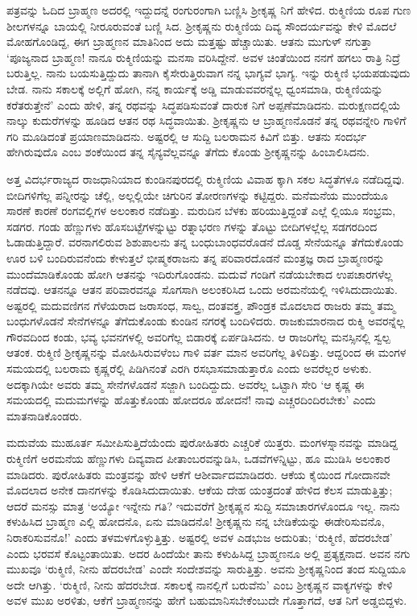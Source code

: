 ಪತ್ರವನ್ನು ಓದಿದ ಬ್ರಾಹ್ಮಣ ಅದರಲ್ಲಿ ಇದ್ದುದನ್ನೆ ರಂಗುರಂಗಾಗಿ ಬಣ್ಣಿಸಿ ಶ್ರೀಕೃಷ್ಣ ನಿಗೆ ಹೇಳಿದ. ರುಕ್ಮಿಣಿಯ ರೂಪ ಗುಣ ಶೀಲಗಳನ್ನೂ ಬಾಯಲ್ಲಿ ನೀರೂರುವಂತೆ ಬಣ್ಣಿ ಸಿದ. ಶ್ರೀಕೃಷ್ಣನು ರುಕ್ಮಿಣಿಯ ದಿವ್ಯ ಸೌಂದರ್ಯವನ್ನು ಕೇಳಿ ಮೊದಲೆ ಮೋಹಗೊಂಡಿದ್ದ, ಈಗ ಬ್ರಾಹ್ಮಣನ ಮಾತಿನಿಂದ ಅದು ಮತ್ತಷ್ಟು ಹೆಚ್ಚಾಯಿತು. ಆತನು ಮುಗುಳ್ ನಗುತ್ತಾ ‘ಪೂಜ್ಯನಾದ ಬ್ರಾಹ್ಮಣ! ನಾನೂ ರುಕ್ಮಿಣಿಯನ್ನು ಮನಸಾ ವರಿಸಿದ್ದೇನೆ. ಅವಳ ಚಿಂತೆಯಿಂದ ನನಗೆ ಹಗಲು ರಾತ್ರಿ ನಿದ್ರೆ ಬರುತ್ತಿಲ್ಲ. ನಾನು ಬಯಸುತ್ತಿದ್ದುದು ತಾನಾಗಿ ಕೈಸೇರುತ್ತಿರುವಾಗ ನನ್ನ ಭಾಗ್ಯವೆ ಭಾಗ್ಯ. ಇನ್ನು ರುಕ್ಮಿಣಿ ಭಯಪಡುವುದು ಬೇಡ. ನಾನು ಸಕಾಲಕ್ಕೆ ಅಲ್ಲಿಗೆ ಹೋಗಿ, ನನ್ನ ಕಾರ್ಯಕ್ಕೆ ಅಡ್ಡಿ ಮಾಡುವವರನ್ನೆಲ್ಲ ಧ್ವಂಸಮಾಡಿ, ರುಕ್ಮಿಣಿಯನ್ನು ಕರೆತರುತ್ತೇನೆ’ ಎಂದು ಹೇಳಿ, ತನ್ನ ರಥವನ್ನು ಸಿದ್ಧಪಡಿಸುವಂತೆ ದಾರುಕ ನಿಗೆ ಅಪ್ಪಣೆಮಾಡಿದನು. ಮರುಕ್ಷಣದಲ್ಲಿಯೆ ನಾಲ್ಕು ಕುದುರೆಗಳನ್ನು ಹೂಡಿದ ಆತನ ರಥ ಸಿದ್ಧವಾಯಿತು. ಶ್ರೀಕೃಷ್ಣನು ಆ ಬ್ರಾಹ್ಮಣನೊಡನೆ ತನ್ನ ರಥವನ್ನೇರಿ ಗಾಳಿಗೆ ಗರಿ ಮೂಡಿದಂತೆ ಪ್ರಯಾಣಮಾಡಿದನು. ಅಷ್ಟರಲ್ಲಿ ಆ ಸುದ್ದಿ ಬಲರಾಮನ ಕಿವಿಗೆ ಬಿತ್ತು. ಆತನು ಸಂದರ್ಭ ಹೇಗಿರುವುದೊ ಎಂಬ ಶಂಕೆಯಿಂದ ತನ್ನ ಸೈನ್ಯವೆಲ್ಲವನ್ನೂ ತೆಗೆದು ಕೊಂಡು ಶ್ರೀಕೃಷ್ಣನನ್ನು ಹಿಂಬಾಲಿಸಿದನು.

ಅತ್ತ ವಿದರ್ಭರಾಜ್ಯದ ರಾಜಧಾನಿಯಾದ ಕುಂಡಿನಪುರದಲ್ಲಿ ರುಕ್ಮಿಣಿಯ ವಿವಾಹ ಕ್ಕಾಗಿ ಸಕಲ ಸಿದ್ಧತೆಗಳೂ ನಡೆದಿದ್ದವು. ಬೀದಿಗಳಿಗೆಲ್ಲ ಪನ್ನೀರನ್ನು ಚೆಲ್ಲಿ, ಅಲ್ಲಲ್ಲಿಯೇ ಚಿಗುರಿನ ತೋರಣಗಳನ್ನು ಕಟ್ಟಿದ್ದರು. ಮನೆಮನೆಯ ಮುಂದೆಯೂ ಸಾರಣೆ ಕಾರಣೆ ರಂಗವಲ್ಲಿಗಳ ಅಲಂಕಾರ ನಡೆದಿತ್ತು. ಮರುದಿನ ಬೆಳಕು ಹರಿಯುತ್ತಿದ್ದಂತೆ ಎಲ್ಲೆ ಲ್ಲಿಯೂ ಸಂಭ್ರಮ, ಸಡಗರ. ಗಂಡು ಹೆಣ್ಣುಗಳು ಹೊಸಬಟ್ಟೆಗಳನ್ನುಟ್ಟು ರತ್ನಾಭರಣ ಗಳನ್ನು ತೊಟ್ಟು ಬೀದಿಗಳಲ್ಲೆಲ್ಲ ಸಡಗರದಿಂದ ಓಡಾಡುತ್ತಿದ್ದಾರೆ. ವರನಾಗಲಿರುವ ಶಿಶುಪಾಲನು ತನ್ನ ಬಂಧುಬಾಂಧವರೊಡನೆ ದೊಡ್ಡ ಸೇನೆಯನ್ನೂ ತೆಗೆದುಕೊಂಡು ಊರ ಬಳಿ ಬಂದಿರುವನೆಂದು ಕೇಳುತ್ತಲೆ ಭೀಷ್ಮಕರಾಜನು ತನ್ನ ಪರಿವಾರದೊಡನೆ ಮಂತ್ರಜ್ಞ ರಾದ ಬ್ರಾಹ್ಮಣರನ್ನು ಮುಂದೆಮಾಡಿಕೊಂಡು ಹೋಗಿ ಆತನನ್ನು ಇದಿರುಗೊಂಡನು. ಮದುವೆ ಗಂಡಿಗೆ ನಡೆಯಬೇಕಾದ ಉಪಚಾರಗಳೆಲ್ಲ ನಡೆದವು. ಆತನನ್ನೂ ಆತನ ಪರಿವಾರವನ್ನೂ ಸೊಗಸಾಗಿ ಅಲಂಕರಿಸಿದ ಒಂದು ಅರಮನೆಯಲ್ಲಿ ಇಳಿಸಿದುದಾಯಿತು. ಅಷ್ಟರಲ್ಲಿ ಮದುವಣಿಗನ ಗೆಳೆಯರಾದ ಜರಾಸಂಧ, ಸಾಲ್ವ, ದಂತವಕ್ತ್ರ, ಪೌಂಡ್ರಕ ಮೊದಲಾದ ರಾಜರು ತಮ್ಮ ತಮ್ಮ ಬಂಧುಗಳೊಡನೆ ಸೇನೆಗಳನ್ನೂ ತೆಗೆದುಕೊಂಡು ಕುಂಡಿನ ನಗರಕ್ಕೆ ಬಂದಿಳಿದರು. ರಾಜಕುಮಾರನಾದ ರುಕ್ಮಿ ಅವರನ್ನೆಲ್ಲ ಗೌರವದಿಂದ ಕಂಡು, ಭವ್ಯ ಭವನಗಳಲ್ಲಿ ಅವರಿಗೆಲ್ಲ ಬಿಡಾರಕ್ಕೆ ಏರ್ಪಡಿಸಿದನು. ಆ ರಾಜರಿಗೆಲ್ಲ ಮನಸ್ಸಿನಲ್ಲಿ ಸ್ವಲ್ಪ ಆತಂಕ. ರುಕ್ಮಿಣಿ ಶ್ರೀಕೃಷ್ಣನನ್ನು ಮೋಹಿಸಿರುವಳೆಂಬ ಗಾಳಿ ವರ್ತ ಮಾನ ಅವರಿಗೆಲ್ಲ ತಿಳಿದಿತ್ತು. ಆದ್ದರಿಂದ ಈ ಮಂಗಳ ಸಮಯದಲ್ಲಿ ಬಲರಾಮ ಕೃಷ್ಣರೆಲ್ಲಿ ಪಿಡಿಗಿನಂತೆ ಎರಗಿ ರಸಭಾಸಮಾಡುತ್ತಾರೊ ಎಂದು ಅವರೆಲ್ಲರ ಅಳುಕು. ಅದಕ್ಕಾಗಿಯೇ ಅವರು ತಮ್ಮ ಸೇನೆಗಳೊಡನೆ ಸಜ್ಜಾಗಿ ಬಂದಿದ್ದುದು. ಅವರೆಲ್ಲ ಒಟ್ಟಾಗಿ ಸೇರಿ ‘ಆ ಕೃಷ್ಣ ಈ ಸಮಯದಲ್ಲಿ ಮದುಮಗಳನ್ನು ಹೊತ್ತುಕೊಂಡು ಹೋದರೂ ಹೋದನೆ! ನಾವು ಎಚ್ಚರದಿಂದಿರಬೇಕು’ ಎಂದು ಮಾತನಾಡಿಕೊಂಡರು.

ಮದುವೆಯ ಮುಹೂರ್ತ ಸಮೀಪಿಸುತ್ತಿದೆಯೆಂದು ಪುರೋಹಿತರು ಎಚ್ಚರಿಕೆ ಯಿತ್ತರು. ಮಂಗಳಸ್ನಾನವನ್ನು ಮಾಡಿದ್ದ ರುಕ್ಮಿಣಿಗೆ ಅರಮನೆಯ ಹೆಣ್ಣುಗಳು ದಿವ್ಯವಾದ ಪೀತಾಂಬರವನ್ನುಡಿಸಿ, ಒಡವೆಗಳನ್ನಿಟ್ಟು, ಹೂ ಮುಡಿಸಿ ಅಲಂಕಾರ ಮಾಡಿದರು. ಪುರೋಹಿತರು ಮಂತ್ರವನ್ನು ಹೇಳಿ ಆಕೆಗೆ ಆಶೀರ್ವಾದಮಾಡಿದರು. ಆಕೆಯ ಕೈಯಿಂದ ಗೋದಾನವೇ ಮೊದಲಾದ ಅನೇಕ ದಾನಗಳನ್ನು ಕೊಡಿಸಿದುದಾಯಿತು. ಆಕೆಯ ದೇಹ ಯಂತ್ರದಂತೆ ಹೇಳಿದ ಕೆಲಸ ಮಾಡುತ್ತಿತ್ತು; ಆದರೆ ಮನಸ್ಸು ಮಾತ್ರ ‘ಅಯ್ಯೋ ಇನ್ನೇನು ಗತಿ? ಇದುವರೆಗೆ ಶ್ರೀಕೃಷ್ಣನ ಸುದ್ದಿ ಸಮಾಚಾರಗಳೊಂದೂ ಇಲ್ಲ. ನಾನು ಕಳುಹಿಸಿದ ಬ್ರಾಹ್ಮಣ ಎಲ್ಲಿ ಹೋದನೊ, ಏನು ಮಾಡಿದನೊ! ಶ್ರೀಕೃಷ್ಣನು ನನ್ನ ಬೇಡಿಕೆಯನ್ನು ಈಡೇರಿಸುವನೊ, ನಿರಾಕರಿಸುವನೊ!’ ಎಂದು ತಳಮಳಗೊಳ್ಳುತ್ತಿತ್ತು. ಅಷ್ಟರಲ್ಲಿ ಅವಳ ಎಡಭುಜ ಅದುರಿತು; ‘ರುಕ್ಮಿಣಿ, ಹೆದರಬೇಡ’ ಎಂದು ಭರವಸೆ ಕೊಟ್ಟಂತಾಯಿತು. ಅದರ ಹಿಂದೆಯೇ ತಾನು ಕಳುಹಿಸಿದ್ದ ಬ್ರಾಹ್ಮಣನೂ ಅಲ್ಲಿ ಪ್ರತ್ಯಕ್ಷನಾದ. ಅವನ ನಗು ಮುಖವೂ ‘ರುಕ್ಮಿಣಿ, ನೀನು ಹೆದರಬೇಡ’ ಎಂದೇ ಸಂದೇಶವನ್ನು ಸಾರುತ್ತಿತ್ತು. ಅವನು ಶ್ರೀಕೃಷ್ಣನಿಂದ ತಂದ ಸುದ್ದಿಯೂ ಅದೇ ಆಗಿತ್ತು. ‘ರುಕ್ಮಿಣಿ, ನೀನು ಹೆದರಬೇಡ. ಸಕಾಲಕ್ಕೆ ನಾನಲ್ಲಿಗೆ ಬರುವೆನು’ ಎಂಬ ಶ್ರೀಕೃಷ್ಣನ ವಾಕ್ಯಗಳನ್ನು ಕೇಳಿ ಅವಳ ಮುಖ ಅರಳಿತು, ಆಕೆಗೆ ಬ್ರಾಹ್ಮಣನನ್ನು ಹೇಗೆ ಬಹುಮಾನಿಸಬೇಕೆಂಬುದೇ ಗೊತ್ತಾಗದೆ, ಆತ ನಿಗೆ ಅಡ್ಡಬಿದ್ದಳು.

